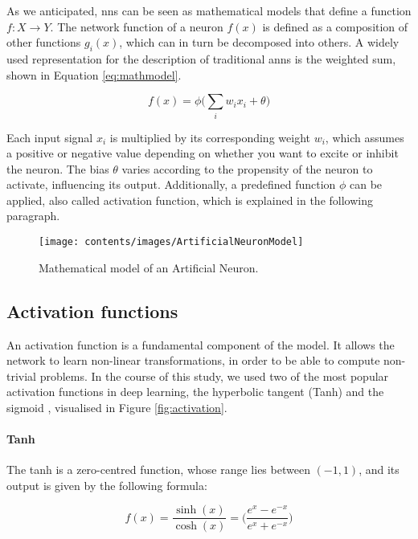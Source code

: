 As we anticipated, \glspl{nn} can be seen as mathematical models that define a 
function $f : X \rightarrow Y$. 
The network function of a neuron $f(x)$ is defined as a composition of
other functions $g_i(x)$, which can in turn be decomposed into others.
A widely used representation for the description of traditional \glspl{ann} is the 
weighted sum, shown in Equation \ref{eq:mathmodel}.

\begin{Equation}[!h]
	\centering
	\begin{equation}
	f(x)=\phi \bigg( \sum_{i}w_{i}x_i + \theta \bigg)
	\end{equation}
	\caption[Mathematical description of traditional \glspl{ann}.]{Function that 
		describes mathematically the traditional \glspl{ann} in terms of weighted sum.}
	\label{eq:mathmodel}
\end{Equation}
Each input signal $x_i$ is multiplied by its corresponding weight $w_{i}$, which 
assumes a positive or negative value depending on whether you want to excite or 
inhibit the neuron.
The bias $\theta$ varies according to the propensity of the neuron to activate, 
influencing its output.
Additionally, a predefined function $\phi$ can be applied, also called activation 
function, which is explained in the following paragraph.

\begin{figure}[htb]
	\centering
	\texttt{[image: contents/images/ArtificialNeuronModel]}
	\caption{Mathematical model of an Artificial Neuron.}
	\label{fig:neuron}
	\vspace{-0.5cm}
\end{figure}

\subsection{Activation functions}
\label{subsec:activationfun}

An activation function is a fundamental component of the model. It allows the 
network to learn non-linear transformations, in order to be able to compute 
non-trivial problems.
In the course of this study, we used two of the most popular activation functions  
in deep learning, the {hyperbolic tangent} (Tanh) \cite[][]{kalman1992tanh} 
and the {sigmoid} \cite[][]{han1995influence}, visualised in Figure 
\ref{fig:activation}.

\paragraph*{Tanh}
The tanh is a zero-centred function, whose range lies between $(-1, 1)$, and its 
output is given by the following formula:
\begin{Equation}[H]
	\centering
	\begin{equation}
	f(x)= \frac{\sinh (x)}{\cosh (x)} = \bigg( \frac{e^x - e^{-x}}{e^x + 
		e^{-x}}\bigg)
	\end{equation}
	\caption{Hyperbolic Tangent Function (Tanh).}
	\label{eq:tanh}
\end{Equation}


